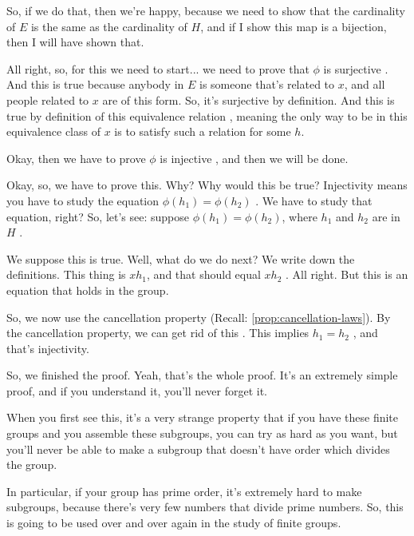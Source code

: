 \begin{speech}[00:25:12 - 00:25:57]
So, if we do that, then we're happy, because we need to show that the cardinality of $E$ is the same as the cardinality of $H$, and if I show this map is a bijection, then I will have shown that.

All right, so, for this we need to start... we need to prove that $\phi$ is surjective . And this is true because anybody in $E$ is someone that's related to $x$, and all people related to $x$ are of this form. So, it's surjective by definition. And this is true by definition of this equivalence relation , meaning the only way to be in this equivalence class of $x$ is to satisfy such a relation for some $h$.
\end{speech}

\begin{speech}[00:25:57 - 00:27:37]
Okay, then we have to prove $\phi$ is injective , and then we will be done.

Okay, so, we have to prove this. Why? Why would this be true? Injectivity means you have to study the equation $\phi(h_1) = \phi(h_2)$ . We have to study that equation, right? So, let's see: suppose $\phi(h_1) = \phi(h_2)$, where $h_1$ and $h_2$ are in $H$ .

We suppose this is true. Well, what do we do next? We write down the definitions. This thing is $xh_1$, and that should equal $xh_2$ . All right. But this is an equation that holds in the group.

So, we now use the cancellation property (Recall: \cref{prop:cancellation-laws}). By the cancellation property, we can get rid of this . This implies $h_1 = h_2$ , and that's injectivity.

So, we finished the proof. Yeah, that's the whole proof. It's an extremely simple proof, and if you understand it, you'll never forget it.

When you first see this, it's a very strange property that if you have these finite groups and you assemble these subgroups, you can try as hard as you want, but you'll never be able to make a subgroup that doesn't have order which divides the group.

In particular, if your group has prime order, it's extremely hard to make subgroups, because there's very few numbers that divide prime numbers. So, this is going to be used over and over again in the study of finite groups.
\end{speech}

